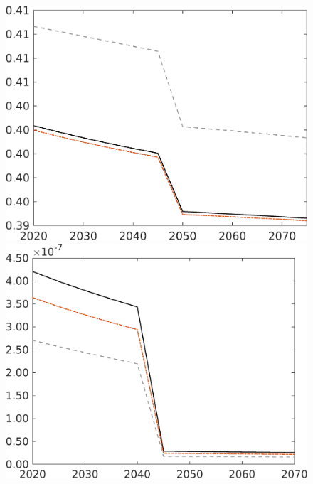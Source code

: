 \begin{figure}[h!!]
\begin{minipage}[]{0.32\textwidth}
\end{minipage}
\begin{minipage}[]{0.32\textwidth}
	\includegraphics[width=1\textwidth]{../../codding_model/own_basedOnFried/optimalPol_010922_revision/figures/all_13Sept22/CompRed_TaulCalib_EY_spillover0_knspil0_nsk0_xgr0_sep0_LFlimit1_emsbase0_countec0_GovRev0_etaa0.79_lgd0.png}
\end{minipage}
\begin{minipage}[]{0.32\textwidth}
	\includegraphics[width=1\textwidth]{../../codding_model/own_basedOnFried/optimalPol_010922_revision/figures/all_13Sept22/CompRed_TaulCalib_gAf_spillover0_knspil0_nsk0_xgr0_sep0_LFlimit1_emsbase0_countec0_GovRev0_etaa0.79_lgd0.png}

\end{minipage}
\end{figure}
